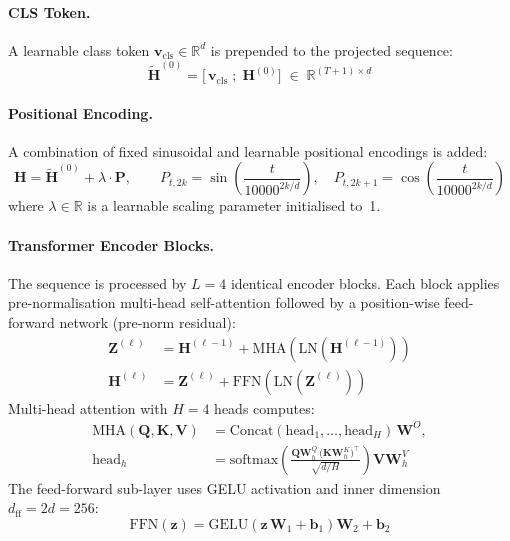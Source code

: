 \paragraph{CLS Token.}
A learnable class token $\mathbf{v}_{\mathrm{cls}} \in \mathbb{R}^{d}$ is
prepended to the projected sequence:
\begin{equation}
    \widetilde{\mathbf{H}}^{(0)} =
    \bigl[\,\mathbf{v}_{\mathrm{cls}}\;;\;\mathbf{H}^{(0)}\bigr]
    \;\in\; \mathbb{R}^{(T+1) \times d}
\end{equation}

\paragraph{Positional Encoding.}
A combination of fixed sinusoidal and learnable positional encodings is
added:
\begin{equation}
    \mathbf{H} = \widetilde{\mathbf{H}}^{(0)} + \lambda \cdot \mathbf{P},
    \qquad
    P_{t,2k}   = \sin\!\left(\frac{t}{10000^{2k/d}}\right), \quad
    P_{t,2k+1} = \cos\!\left(\frac{t}{10000^{2k/d}}\right)
\end{equation}
where $\lambda \in \mathbb{R}$ is a learnable scaling parameter initialised
to~1.

\paragraph{Transformer Encoder Blocks.}
The sequence is processed by $L = 4$ identical encoder blocks.
Each block applies pre-normalisation multi-head self-attention followed
by a position-wise feed-forward network (pre-norm residual):
\begin{align}
    \mathbf{Z}^{(\ell)} &= \mathbf{H}^{(\ell-1)}
        + \mathrm{MHA}\!\left(\mathrm{LN}\!\left(\mathbf{H}^{(\ell-1)}\right)\right)
    \label{eq:attn_res} \\
    \mathbf{H}^{(\ell)} &= \mathbf{Z}^{(\ell)}
        + \mathrm{FFN}\!\left(\mathrm{LN}\!\left(\mathbf{Z}^{(\ell)}\right)\right)
    \label{eq:ffn_res}
\end{align}
Multi-head attention with $H = 4$ heads computes:
\begin{align}
    \mathrm{MHA}(\mathbf{Q},\mathbf{K},\mathbf{V}) &=
    \mathrm{Concat}(\mathrm{head}_1, \ldots, \mathrm{head}_H)\,\mathbf{W}^{O},
    \nonumber \\
    \mathrm{head}_h &= \mathrm{softmax}\!\left(
        \frac{\mathbf{Q}\mathbf{W}^{Q}_h\,
              \bigl(\mathbf{K}\mathbf{W}^{K}_h\bigr)^{\!\top}}
             {\sqrt{d/H}}
    \right)\mathbf{V}\mathbf{W}^{V}_h
\end{align}
The feed-forward sub-layer uses GELU activation and inner dimension
$d_{\mathrm{ff}} = 2d = 256$:
\begin{equation}
    \mathrm{FFN}(\mathbf{z}) =
    \mathrm{GELU}\!\left(\mathbf{z}\,\mathbf{W}_1 + \mathbf{b}_1\right)
    \mathbf{W}_2 + \mathbf{b}_2
\end{equation}

